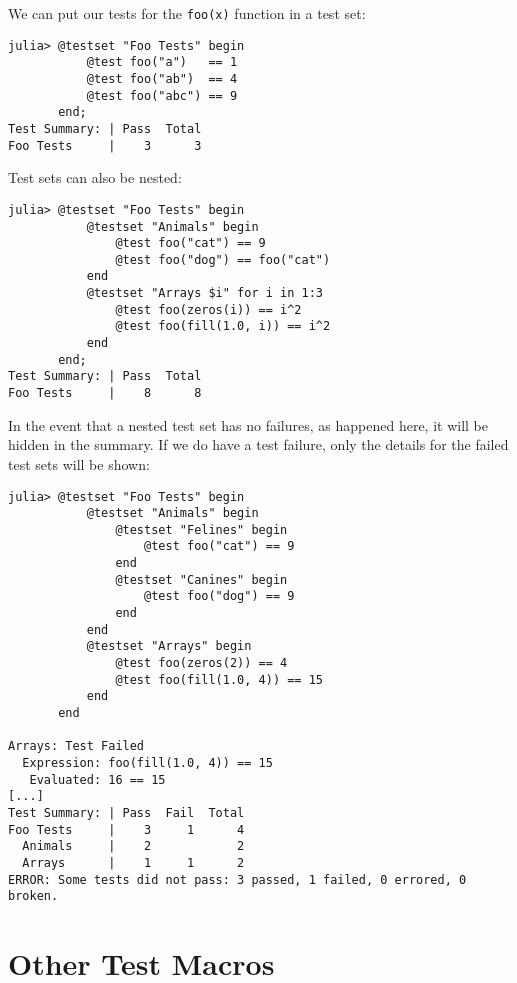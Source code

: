 We can put our tests for the \texttt{foo(x)} function in a test set:




\begin{verbatim}
julia> @testset "Foo Tests" begin
           @test foo("a")   == 1
           @test foo("ab")  == 4
           @test foo("abc") == 9
       end;
Test Summary: | Pass  Total
Foo Tests     |    3      3
\end{verbatim}



Test sets can also be nested:




\begin{verbatim}
julia> @testset "Foo Tests" begin
           @testset "Animals" begin
               @test foo("cat") == 9
               @test foo("dog") == foo("cat")
           end
           @testset "Arrays $i" for i in 1:3
               @test foo(zeros(i)) == i^2
               @test foo(fill(1.0, i)) == i^2
           end
       end;
Test Summary: | Pass  Total
Foo Tests     |    8      8
\end{verbatim}



In the event that a nested test set has no failures, as happened here, it will be hidden in the summary. If we do have a test failure, only the details for the failed test sets will be shown:




\begin{verbatim}
julia> @testset "Foo Tests" begin
           @testset "Animals" begin
               @testset "Felines" begin
                   @test foo("cat") == 9
               end
               @testset "Canines" begin
                   @test foo("dog") == 9
               end
           end
           @testset "Arrays" begin
               @test foo(zeros(2)) == 4
               @test foo(fill(1.0, 4)) == 15
           end
       end

Arrays: Test Failed
  Expression: foo(fill(1.0, 4)) == 15
   Evaluated: 16 == 15
[...]
Test Summary: | Pass  Fail  Total
Foo Tests     |    3     1      4
  Animals     |    2            2
  Arrays      |    1     1      2
ERROR: Some tests did not pass: 3 passed, 1 failed, 0 errored, 0 broken.
\end{verbatim}



\hypertarget{3398758978677734843}{}


\section{Other Test Macros}



